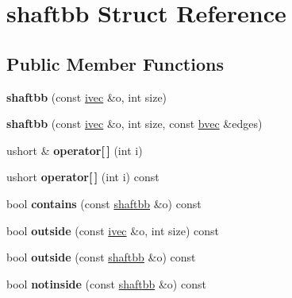 \hypertarget{structshaftbb}{}\section{shaftbb Struct Reference}
\label{structshaftbb}
\subsection*{Public Member Functions}
\begin{DoxyCompactItemize}
\item 
\mbox{\label{structshaftbb_aa77f93a8ae28d15e6bed323c0f64f474}} 
{\bfseries shaftbb} (const \hyperlink{structivec}{ivec} \&o, int size)
\item 
\mbox{\label{structshaftbb_aa5cd7ed76839c61b7cade9e4b0396303}} 
{\bfseries shaftbb} (const \hyperlink{structivec}{ivec} \&o, int size, const \hyperlink{structbvec}{bvec} \&edges)
\item 
\mbox{\label{structshaftbb_a1524c287646b65f72b7c4c4ef9dccd39}} 
ushort \& {\bfseries operator\mbox{[}$\,$\mbox{]}} (int i)
\item 
\mbox{\label{structshaftbb_abfe15d0ef81fe161afe0dac915641d86}} 
ushort {\bfseries operator\mbox{[}$\,$\mbox{]}} (int i) const
\item 
\mbox{\label{structshaftbb_ad0bb9f775239324fa5e697e827cbd5c2}} 
bool {\bfseries contains} (const \hyperlink{structshaftbb}{shaftbb} \&o) const
\item 
\mbox{\label{structshaftbb_a96120241bb9a9e416ee0d9edd4e2b492}} 
bool {\bfseries outside} (const \hyperlink{structivec}{ivec} \&o, int size) const
\item 
\mbox{\label{structshaftbb_a83b6722b4594f0322cd7f1a5278626bc}} 
bool {\bfseries outside} (const \hyperlink{structshaftbb}{shaftbb} \&o) const
\item 
\mbox{\label{structshaftbb_a3c8ee860665381ca1d3f7661f7b7876d}} 
bool {\bfseries notinside} (const \hyperlink{structshaftbb}{shaftbb} \&o) const
\end{DoxyCompactItemize}
